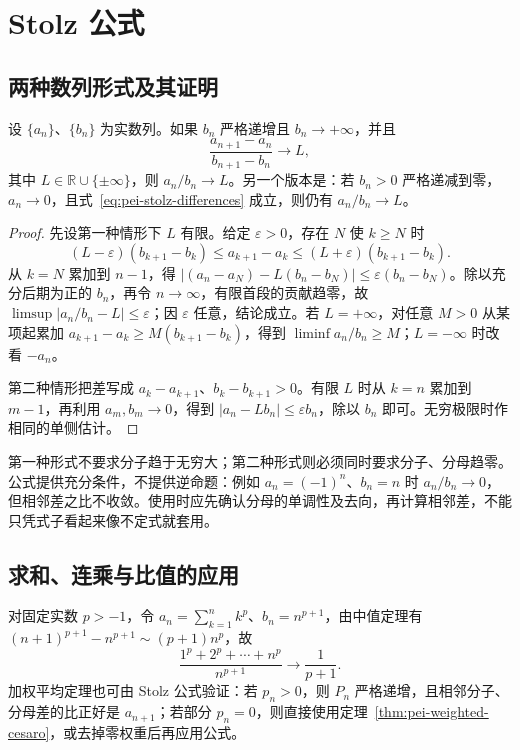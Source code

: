 \section{Stolz 公式}
\label{sec:pei-stolz}

\subsection{两种数列形式及其证明}

\begin{theorem}[Stolz 公式]
\label{thm:pei-stolz}
设 $\{a_n\}$、$\{b_n\}$ 为实数列。如果 $b_n$ 严格递增且 $b_n\to+\infty$，并且
\begin{equation}
    \frac{a_{n+1}-a_n}{b_{n+1}-b_n}\longrightarrow L,
    \label{eq:pei-stolz-differences}
\end{equation}
其中 $L\in\mathbb{R}\cup\{\pm\infty\}$，则 $a_n/b_n\to L$。另一个版本是：若 $b_n>0$ 严格递减到零，$a_n\to0$，且式~\eqref{eq:pei-stolz-differences} 成立，则仍有 $a_n/b_n\to L$。
\end{theorem}
\begin{proof}
先设第一种情形下 $L$ 有限。给定 $\varepsilon>0$，存在 $N$ 使 $k\ge N$ 时
\[
    (L-\varepsilon)(b_{k+1}-b_k)
    \le a_{k+1}-a_k
    \le(L+\varepsilon)(b_{k+1}-b_k).
\]
从 $k=N$ 累加到 $n-1$，得 $|(a_n-a_N)-L(b_n-b_N)|\le\varepsilon(b_n-b_N)$。除以充分后期为正的 $b_n$，再令 $n\to\infty$，有限首段的贡献趋零，故 $\limsup|a_n/b_n-L|\le\varepsilon$；因 $\varepsilon$ 任意，结论成立。若 $L=+\infty$，对任意 $M>0$ 从某项起累加 $a_{k+1}-a_k\ge M(b_{k+1}-b_k)$，得到 $\liminf a_n/b_n\ge M$；$L=-\infty$ 时改看 $-a_n$。

第二种情形把差写成 $a_k-a_{k+1}$、$b_k-b_{k+1}>0$。有限 $L$ 时从 $k=n$ 累加到 $m-1$，再利用 $a_m,b_m\to0$，得到 $|a_n-Lb_n|\le\varepsilon b_n$，除以 $b_n$ 即可。无穷极限时作相同的单侧估计。
\end{proof}

第一种形式不要求分子趋于无穷大；第二种形式则必须同时要求分子、分母趋零。公式提供充分条件，不提供逆命题：例如 $a_n=(-1)^n$、$b_n=n$ 时 $a_n/b_n\to0$，但相邻差之比不收敛。使用时应先确认分母的单调性及去向，再计算相邻差，不能只凭式子看起来像不定式就套用。

\subsection{求和、连乘与比值的应用}

对固定实数 $p>-1$，令 $a_n=\sum_{k=1}^nk^p$、$b_n=n^{p+1}$，由中值定理有 $(n+1)^{p+1}-n^{p+1}\sim(p+1)n^p$，故
\begin{equation}
    \frac{1^p+2^p+\cdots+n^p}{n^{p+1}}\longrightarrow\frac1{p+1}.
    \label{eq:pei-power-sums}
\end{equation}
加权平均定理也可由 Stolz 公式验证：若 $p_n>0$，则 $P_n$ 严格递增，且相邻分子、分母差的比正好是 $a_{n+1}$；若部分 $p_n=0$，则直接使用定理~\ref{thm:pei-weighted-cesaro}，或去掉零权重后再应用公式。

